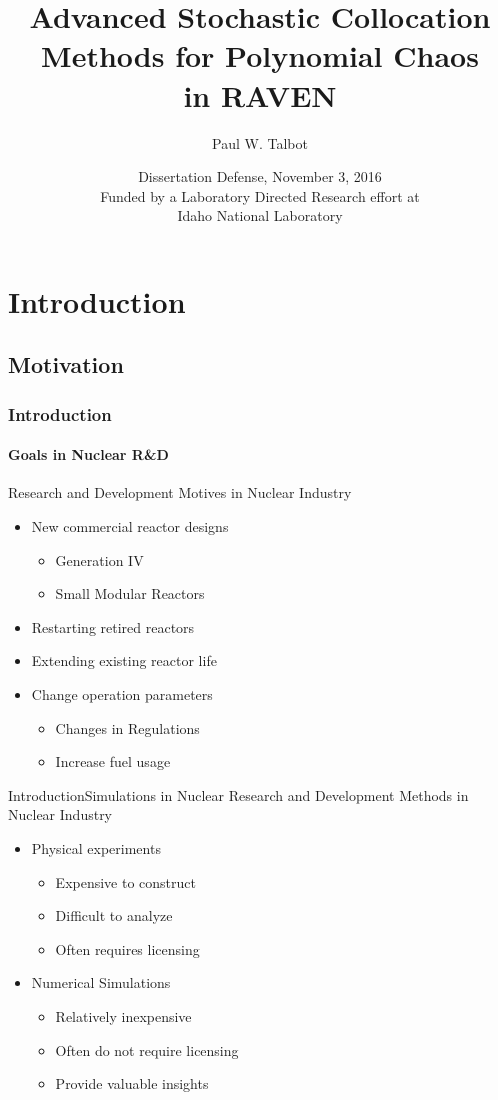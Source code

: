 \documentclass{beamer}
\title[Advanced UQ in RAVEN] %
{Advanced Stochastic Collocation \\Methods for Polynomial Chaos\\ in RAVEN}
\author[Talbot] %
{Paul W. Talbot}%
\institute[University of New Mexico] %
{
  University of New Mexico%
}
\date[Nov. 3 2016] %
{Dissertation Defense, November 3, 2016\\\vspace{10pt}\small Funded by a Laboratory Directed Research effort
at \\Idaho National Laboratory}
\begin{document}
\begin{frame}
  \titlepage
\end{frame}


\section{Introduction}
\subsection{Motivation}
\begin{frame}
  \frametitle{Introduction}
  \framesubtitle{Goals in Nuclear R\&D}\vspace{-20pt}
  \vfill
  Research and Development Motives in Nuclear Industry
  \vfill
  \begin{itemize}
    \item New commercial reactor designs
      \begin{itemize}
        \item Generation IV
        \item Small Modular Reactors
      \end{itemize}
  \vfill
    \item Restarting retired reactors
  \vfill
    \item Extending existing reactor life
  \vfill
    \item Change operation parameters
      \begin{itemize}
        \item Changes in Regulations
        \item Increase fuel usage
      \end{itemize}
  \end{itemize}
  \vfill
\end{frame}

\begin{frame}{Introduction}{Simulations in Nuclear}\vspace{-20pt}
  \vfill
  Research and Development Methods in Nuclear Industry
  \vfill
  \begin{itemize}
    \item Physical experiments
      \begin{itemize}
        \item Expensive to construct
        \item Difficult to analyze
        \item Often requires licensing
      \end{itemize}
  \vfill
    \item Numerical Simulations
      \begin{itemize}
        \item Relatively inexpensive
        \item Often do not require licensing
        \item Provide valuable insights
      \end{itemize}
  \end{itemize}
  \vfill
\end{frame}
\end{document}
